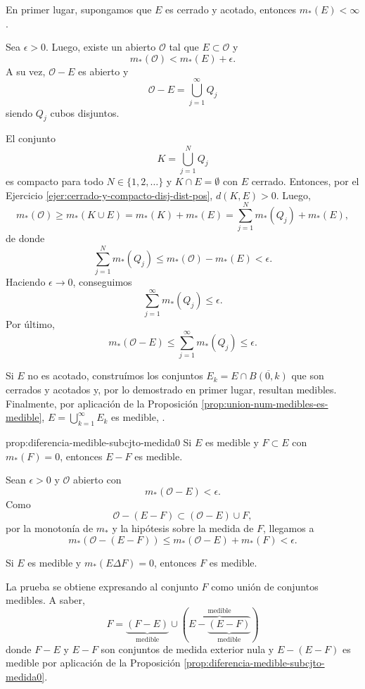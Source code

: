 \begin{demo}{}
En primer lugar, supongamos que $E$ es cerrado y  acotado, entonces $m_{*}(E)<\infty$. 

Sea $\epsilon>0$. Luego, existe un abierto $\mathcal{O}$ tal que 
$E\subset \mathcal{O}$ y 
\[
m_{*}(\mathcal{O})<m_{*}(E)+\epsilon.
\]
A su vez, $\mathcal{O}-E$ es abierto y 
\[
\mathcal{O}-E=\bigcup\limits_{j=1}^{\infty} Q_j
\]
siendo $Q_j$ cubos disjuntos. 

El conjunto 
\[
K=\bigcup\limits_{j=1}^N Q_j
\]
es compacto para todo $N \in \{1,2,\ldots\}$ y $K\cap E=\emptyset$ con $E$ cerrado.
Entonces, por el Ejercicio \ref{ejer:cerrado-y-compacto-disj-dist-pos},  $d(K,E)>0$. Luego, 
\[
m_{*}(\mathcal{O})\geq  m_{*}(K\cup E)=m_{*}(K)+m_{*}(E)=
\sum\limits_{j=1}^N m_{*}(Q_j)+m_{*}(E),
\]
de donde
\[
\sum\limits_{j=1}^N m_{*}(Q_j) \leq m_{*}(\mathcal{O})-m_{*}(E)<\epsilon.
\]
Haciendo $\epsilon\to 0$, conseguimos
\[
\sum\limits_{j=1}^{\infty} m_{*}(Q_j)\leq \epsilon.
\]
Por \'ultimo, 
\[
m_{*}(\mathcal{O}-E)\leq \sum\limits_{j=1}^{\infty} m_{*}(Q_j)\leq \epsilon.
\]

Si $E$ no es acotado, constru\'imos  los conjuntos $E_k=E\cap \overline{B(0,k)}$ que son cerrados y acotados y, por lo demostrado en primer lugar, resultan medibles.
Finalmente, por aplicaci\'on de la Proposici\'on \ref{prop:union-num-medibles-es-medible}, 
$E=\bigcup\limits_{k=1}^{\infty}E_k$ es medible, . 
\end{demo}

\begin{proposicion}{prop:diferencia-medible-subcjto-medida0}
Si $E$ es medible y $F\subset E$ con $m_{*}(F)=0$, entonces
$E-F$ es medible.
\end{proposicion}

\begin{demo}{}
Sean $\epsilon>0$ y $\mathcal{O}$ abierto con 
\[
m_{*}(\mathcal{O}-E)<\epsilon.
\]
Como
\[
\mathcal{O}-(E-F)\subset (\mathcal{O}-E)\cup F, 
\]
por la monoton\'ia de $m_{*}$ y la hip\'otesis sobre la medida de $F$, llegamos a 
\[
m_{*}\left(\mathcal{O}-(E-F)\right)\leq m_{*}(\mathcal{O}-E)+m_{*}(F)<\epsilon.
\]
\end{demo}

\begin{corolario}{}
Si $E$ es medible  y $m_{*}(E \Delta F)=0$, entonces $F$ es medible.
\end{corolario}

\begin{demo}{}
La prueba se obtiene expresando al conjunto $F$ como uni\'on de conjuntos medibles. A saber, 
\[
F=\underbrace{(F-E)}_{\mbox{medible}} \cup 
\left( 
\overbrace{E-\underbrace{(E-F)}_{\mbox{medible}}}^{\mbox{medible}}\right)
\]
donde $F-E$ y $E-F$ son conjuntos de medida exterior nula y 
$E-(E-F)$  es medible por aplicaci\'on de la Proposici\'on \ref{prop:diferencia-medible-subcjto-medida0}.
\end{demo}


